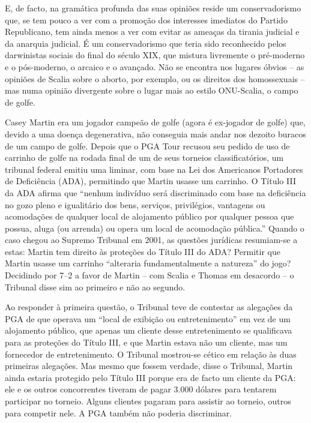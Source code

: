  
\par
 
E, de facto, na gramática profunda das suas opiniões reside um conservadorismo que, se tem pouco a ver com a promoção dos interesses imediatos do Partido Republicano, tem ainda menos a ver com evitar as ameaças da tirania judicial e da anarquia judicial. É um conservadorismo que teria sido reconhecido pelos darwinistas sociais do final do século XIX, que mistura livremente o pré-moderno e o pós-moderno, o arcaico e o avançado. Não se encontra nos lugares óbvios – as opiniões de Scalia sobre o aborto, por exemplo, ou os direitos dos homossexuais – mas numa opinião divergente sobre o lugar mais ao estilo ONU-Scalia, o campo de golfe.
 
\par
 
Casey Martin era um jogador campeão de golfe (agora é ex-jogador de golfe) que, devido a uma doença degenerativa, não conseguia mais andar nos dezoito buracos de um campo de golfe. Depois que o PGA Tour recusou seu pedido de uso de carrinho de golfe na rodada final de um de seus torneios classificatórios, um tribunal federal emitiu uma liminar, com base na Lei dos Americanos Portadores de Deficiência (ADA), permitindo que Martin usasse um carrinho. O Título III da ADA afirma que “nenhum indivíduo será discriminado com base na deficiência no gozo pleno e igualitário dos bens, serviços, privilégios, vantagens ou acomodações de qualquer local de alojamento público por qualquer pessoa que possua, aluga (ou arrenda) ou opera um local de acomodação pública.” Quando o caso chegou ao Supremo Tribunal em 2001, as questões jurídicas resumiam-se a estas: Martin tem direito às proteções do Título III do ADA? Permitir que Martin usasse um carrinho “alteraria fundamentalmente a natureza” do jogo? Decidindo por 7–2 a favor de Martin – com Scalia e Thomas em desacordo – o Tribunal disse sim ao primeiro e não ao segundo.
 
\par
 
Ao responder à primeira questão, o Tribunal teve de contestar as alegações da PGA de que operava um “local de exibição ou entretenimento” em vez de um alojamento público, que apenas um cliente desse entretenimento se qualificava para as proteções do Título III, e que Martin estava não um cliente, mas um fornecedor de entretenimento. O Tribunal mostrou-se cético em relação às duas primeiras alegações. Mas mesmo que fossem verdade, disse o Tribunal, Martin ainda estaria protegido pelo Título III porque era de facto um cliente da PGA: ele e os outros concorrentes tiveram de pagar 3.000 dólares para tentarem participar no torneio. Alguns clientes pagaram para assistir ao torneio, outros para competir nele. A PGA também não poderia discriminar.
 
